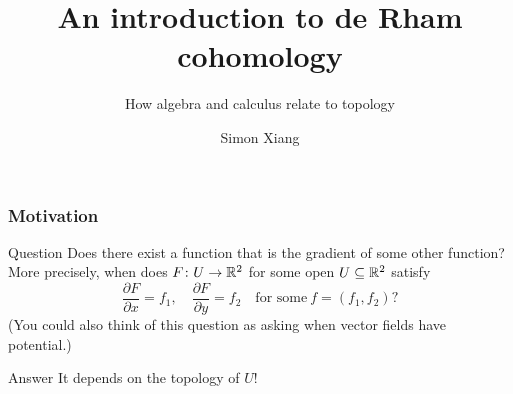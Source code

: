 \documentclass[xcolor=dvipsnames]{beamer}
\title{An introduction to de Rham cohomology}
\subtitle{How algebra and calculus relate to topology}
\author{Simon Xiang}
\institute{University of Texas at Austin}
\begin{document}
 
    \begin{frame}
        \titlepage
    \end{frame}


    \begin{frame}
        \frametitle{Motivation} 
        \begin{exampleblock}{Question} 
            Does there exist a function that is the gradient of some other function? More precisely, when does $F \colon U \to \mathbb{R}^2$ for some open $U \subseteq \mathbb{R}^2$ satisfy \[
                \frac{\partial F}{\partial x}=f_1,\quad \frac{\partial F}{\partial y}=f_2 \quad \text{for some} \ f=(f_1,f_2)?
            \] (You could also think of this question as asking when vector fields have potential.)
        \end{exampleblock}\pause
        \begin{exampleblock}{Answer} 
           It depends on the topology of $U$! 
        \end{exampleblock}
    \end{frame}
    
\end{document}

